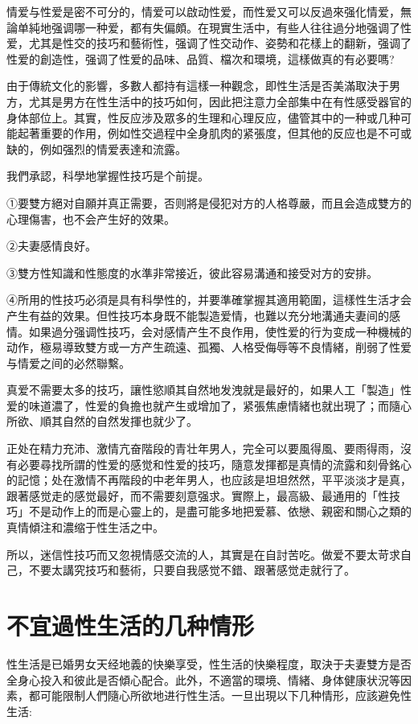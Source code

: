\documentclass[12pt,UTF8]{ctexbook}
\begin{document}
情爱与性爱是密不可分的，情爱可以啟动性爱，而性爱又可以反過來强化情爱，無論单純地强调哪一种爱，都有失偏頗。在現實生活中，有些人往往過分地强调了性爱，尤其是性交的技巧和藝術性，强调了性交动作、姿勢和花樣上的翻新，强调了性爱的創造性，强调了性爱的品味、品質、檔次和環境，這樣做真的有必要嗎?

由于傳統文化的影響，多數人都持有這樣一种觀念，即性生活是否美滿取決于男方，尤其是男方在性生活中的技巧如何，因此把注意力全部集中在有性感受器官的身体部位上。其實，性反应涉及眾多的生理和心理反应，儘管其中的一种或几种可能起著重要的作用，例如性交過程中全身肌肉的紧張度，但其他的反应也是不可或缺的，例如强烈的情爱表達和流露。

我們承認，科學地掌握性技巧是个前提。

①要雙方絕对自願并真正需要，否则將是侵犯对方的人格尊嚴，而且会造成雙方的心理傷害，也不会产生好的效果。

②夫妻感情良好。

③雙方性知識和性態度的水準非常接近，彼此容易溝通和接受对方的安排。

④所用的性技巧必須是具有科學性的，并要準確掌握其適用範圍，這樣性生活才会产生有益的效果。但性技巧本身既不能製造爱情，也難以充分地溝通夫妻间的感情。如果過分强调性技巧，会对感情产生不良作用，使性爱的行为变成一种機械的动作，極易導致雙方或一方产生疏遠、孤獨、人格受侮辱等不良情緒，削弱了性爱与情爱之间的必然聯繫。

真爱不需要太多的技巧，讓性慾順其自然地发洩就是最好的，如果人工「製造」性爱的味道濃了，性爱的負擔也就产生或增加了，紧張焦慮情緒也就出現了；而隨心所欲、順其自然的自然发揮也就少了。

正处在精力充沛、激情亢奋階段的青壮年男人，完全可以要風得風、要雨得雨，沒有必要尋找所謂的性爱的感觉和性爱的技巧，隨意发揮都是真情的流露和刻骨銘心的記憶；处在激情不再階段的中老年男人，也应該是坦坦然然，平平淡淡才是真，跟著感觉走的感觉最好，而不需要刻意强求。實際上，最高級、最通用的「性技巧」不是动作上的而是心靈上的，是盡可能多地把爱慕、依戀、親密和關心之類的真情傾注和濃缩于性生活之中。

所以，迷信性技巧而又忽視情感交流的人，其實是在自討苦吃。做爱不要太苛求自己，不要太講究技巧和藝術，只要自我感觉不錯、跟著感觉走就行了。

\section{不宜過性生活的几种情形}

性生活是已婚男女天经地義的快樂享受，性生活的快樂程度，取決于夫妻雙方是否全身心投入和彼此是否傾心配合。此外，不適當的環境、情緒、身体健康状況等因素，都可能限制人們隨心所欲地进行性生活。一旦出現以下几种情形，应該避免性生活:
\end{document}
